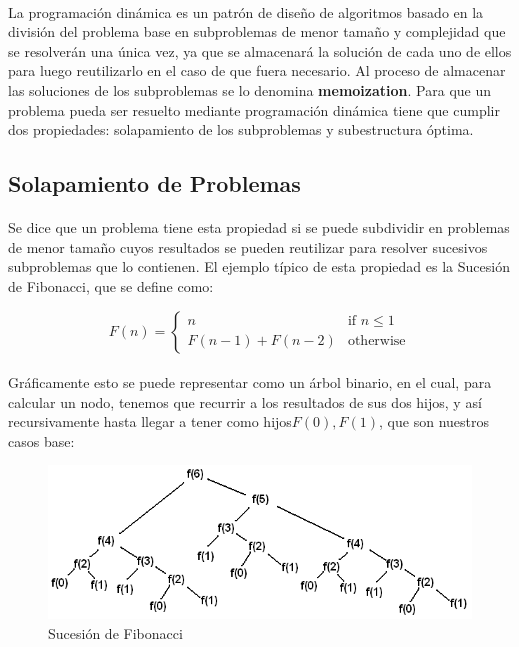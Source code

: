 \documentclass{article}
\begin{document}
		\paragraph{}
		La programación dinámica es un patrón de diseño de algoritmos basado en la división del problema base en subproblemas de menor tamaño y complejidad que se resolverán una única vez, ya que se almacenará la solución de cada uno de ellos para luego reutilizarlo en el caso de que fuera necesario. Al proceso de almacenar las soluciones de los subproblemas se lo denomina \textbf{memoization}. Para que un problema pueda ser resuelto mediante programación dinámica tiene que cumplir dos propiedades: solapamiento de los subproblemas y subestructura óptima.

	\subsection{Solapamiento de Problemas}
		\paragraph{}
		Se dice que un problema tiene esta propiedad si se puede subdividir en problemas de menor tamaño cuyos resultados se pueden reutilizar para resolver sucesivos subproblemas que lo contienen. El ejemplo típico de esta propiedad es la Sucesión de Fibonacci, que se define como:

		\[
   		 F(n)=
			\begin{cases}
    				n					& \text{if } n\leq 1\\
    				F( n - 1) + F(n - 2)		& \text{otherwise}
			\end{cases}
		\]

		\paragraph{}
		Gráficamente esto se puede representar como un árbol binario, en el cual, para calcular un nodo, tenemos que recurrir a los resultados de sus dos hijos, y así recursivamente hasta llegar a tener como hijos$F(0), F(1)$, que son nuestros casos base:

		\begin{figure}[H]
				\centering
				\includegraphics[width=120mm]{../res/fibonacci-sequence.png}
				\caption{Sucesión de Fibonacci \label{example_border}}
		\end{figure}
\end{document}
